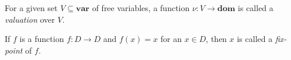 \begin{defn}
For a given set $V \subseteq \textbf{var}$ of free variables, a function $\nu: V \to \textbf{dom}$ is called a \emph{valuation} over $V$.
\end{defn}

\begin{defn}
If $f$ is a function $f: D \to D$ and $f(x) = x$ for an $x \in D$, then $x$ is called a \emph{fix-point} of $f$.
\end{defn}

